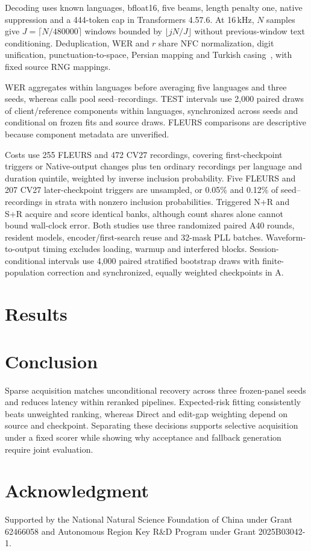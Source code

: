 \documentclass[conference,letterpaper]{IEEEtran}
\begin{document}
Decoding uses known languages, bfloat16, five beams, length penalty one, native suppression and a 444-token cap in Transformers 4.57.6. At 16\,kHz, $N$ samples give $J=\lceil N/480000\rceil$ windows bounded by $\lfloor jN/J\rfloor$ without previous-window text conditioning. Deduplication, WER and $r$ share NFC normalization, digit unification, punctuation-to-space, Persian mapping and Turkish casing~\cite{normalization}, with fixed source RNG mappings.

WER aggregates within languages before averaging five languages and three seeds, whereas calls pool seed--recordings. TEST intervals use 2,000 paired draws of client/reference components within languages, synchronized across seeds and conditional on frozen fits and source draws. FLEURS comparisons are descriptive because component metadata are unverified.

Costs use 255 FLEURS and 472 CV27 recordings, covering first-checkpoint triggers or Native-output changes plus ten ordinary recordings per language and duration quintile, weighted by inverse inclusion probability. Five FLEURS and 207 CV27 later-checkpoint triggers are unsampled, or 0.05\% and 0.12\% of seed--recordings in strata with nonzero inclusion probabilities. Triggered N+R and S+R acquire and score identical banks, although count shares alone cannot bound wall-clock error. Both studies use three randomized paired A40 rounds, resident models, encoder/first-search reuse and 32-mask PLL batches. Waveform-to-output timing excludes loading, warmup and interfered blocks. Session-conditional intervals use 4,000 paired stratified bootstrap draws with finite-population correction and synchronized, equally weighted checkpoints in A.

\section{Results}

\section{Conclusion}
Sparse acquisition matches unconditional recovery across three frozen-panel seeds and reduces latency within reranked pipelines. Expected-risk fitting consistently beats unweighted ranking, whereas Direct and edit-gap weighting depend on source and checkpoint. Separating these decisions supports selective acquisition under a fixed scorer while showing why acceptance and fallback generation require joint evaluation.
\section*{Acknowledgment}
Supported by the National Natural Science Foundation of China under Grant 62466058 and Autonomous Region Key R\&D Program under Grant 2025B03042-1.
\label{iscas:body-end}\clearpage\raggedbottom\balance
\label{iscas:references-start}

\end{document}
